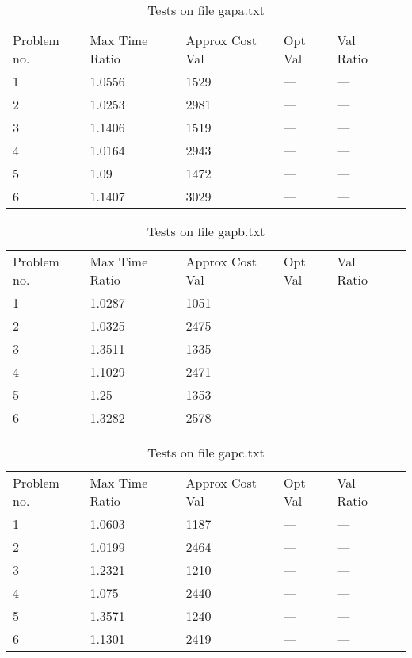     \begin{table}[]
    \caption{Tests on file gapa.txt}
    \centering
    \begin{tabular}{llllll}
    Problem no. & Max Time Ratio & Approx Cost Val  & Opt Val & Val Ratio \\ 1 & 1.0556 & 1529 & --- & ---\\ \hline
2 & 1.0253 & 2981 & --- & ---\\ \hline
3 & 1.1406 & 1519 & --- & ---\\ \hline
4 & 1.0164 & 2943 & --- & ---\\ \hline
5 & 1.09 & 1472 & --- & ---\\ \hline
6 & 1.1407 & 3029 & --- & ---\\ \hline
\end{tabular}
    \end{table}
    

    \begin{table}[]
    \caption{Tests on file gapb.txt}
    \centering
    \begin{tabular}{llllll}
    Problem no. & Max Time Ratio & Approx Cost Val  & Opt Val & Val Ratio \\ 1 & 1.0287 & 1051 & --- & ---\\ \hline
2 & 1.0325 & 2475 & --- & ---\\ \hline
3 & 1.3511 & 1335 & --- & ---\\ \hline
4 & 1.1029 & 2471 & --- & ---\\ \hline
5 & 1.25 & 1353 & --- & ---\\ \hline
6 & 1.3282 & 2578 & --- & ---\\ \hline
\end{tabular}
    \end{table}
    

    \begin{table}[]
    \caption{Tests on file gapc.txt}
    \centering
    \begin{tabular}{llllll}
    Problem no. & Max Time Ratio & Approx Cost Val  & Opt Val & Val Ratio \\ 1 & 1.0603 & 1187 & --- & ---\\ \hline
2 & 1.0199 & 2464 & --- & ---\\ \hline
3 & 1.2321 & 1210 & --- & ---\\ \hline
4 & 1.075 & 2440 & --- & ---\\ \hline
5 & 1.3571 & 1240 & --- & ---\\ \hline
6 & 1.1301 & 2419 & --- & ---\\ \hline
\end{tabular}
    \end{table}
    

